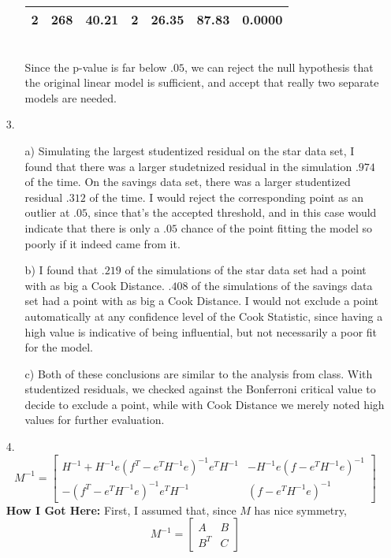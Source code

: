 \documentclass[11pt]{article}
\theoremstyle{definition}
\begin{document}
\begin{itemize}
\begin{itemize}
\begin{table}[ht]
\begin{tabular}{lrrrrrr}
                          2 & 268 & 40.21 & 2 & 26.35 & 87.83 & 0.0000 \\ 
                           \hline
                   \end{tabular}
               \end{table} \\
               Since the p-value is far below $.05$, we can reject the null hypothesis that the original linear model is sufficient, and accept that really two separate models are needed.
        \end{itemize}
    \item[3.]
        \begin{itemize}
            \item[a)]
                Simulating the largest studentized residual on the star data set, I found that there was a larger studetnized residual in the simulation $.974$ of the time. On the savings data set, there was a larger studentized residual $.312$ of the time. I would reject the corresponding point as an outlier at $.05$, since that's the accepted threshold, and in this case would indicate that there is only a $.05$ chance of the point fitting the model so poorly if it indeed came from it.
            \item[b)]
                I found that $.219$ of the simulations of the star data set had a point with as big a Cook Distance. $.408$ of the simulations of the savings data set had a point with as big a Cook Distance. I would not exclude a point automatically at any confidence level of the Cook Statistic, since having a high value is indicative of being influential, but not necessarily a poor fit for the model.
            \item[c)] Both of these conclusions are similar to the analysis from class. With studentized residuals, we checked against the Bonferroni critical value to decide to exclude a point, while with Cook Distance we merely noted high values for further evaluation.
        \end{itemize}
    \item[4.]
        \[ M^{-1} = \left[\begin{array}{cc} H^{-1}+H^{-1}e(f^T-e^TH^{-1}e)^{-1}e^TH^{-1} & -H^{-1}e(f-e^TH^{-1}e)^{-1} \\ -(f^T-e^TH^{-1}e)^{-1}e^TH^{-1} & (f-e^TH^{-1}e)^{-1} \end{array} \right] \]
        {\bf How I Got Here:} First, I assumed that, since $M$ has nice symmetry,
    \[M^{-1} = \left[\begin{array}{cc} A & B \\ B^T & C \end{array}\right] \]

\end{itemize}
\end{document}
